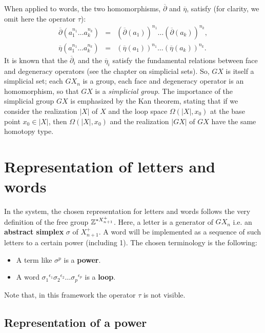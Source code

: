 When applied to words, the two homomorphisms, $\overline{\partial}$ and $\overline{\eta}$,  satisfy
(for cla\-ri\-ty, we omit here the operator $\tau$):
\begin{eqnarray*}
\overline{\partial}(a_1^{n_1}\ldots a_k^{n_k}) &=& (\overline{\partial}(a_1))^{n_1}\ldots
                                                   (\overline{\partial}(a_k))^{n_k}, \\
\overline{\eta}(a_1^{n_1}\ldots a_k^{n_k}) &=& (\overline{\eta}(a_1))^{n_1}\ldots (\overline{\eta}(a_k))^{n_k}.
\end{eqnarray*}
It is known  that the $\overline{\partial}_i$ and the $\overline{\eta}_i$ satisfy the
fundamental relations between face and degeneracy operators (see the chapter on simplicial sets). So,
$GX$ is itself a simplicial set; each $GX_n$ is a group, each face and degeneracy operator
is an homomorphism, so that $GX$ is a {\em simplicial group}.
The importance of the simplicial group $GX$ is emphasized by the Kan theorem, stating
that if we consider the realization $|X|$ of $X$ and the loop space  $\Omega(|X|, x_0)$ at
the base point $x_0 \in |X|$,  then $\Omega(|X|, x_0)$ and
the realization $|GX|$ of $GX$ have the same  homotopy type.

\section {Representation of letters and words}

In the system, the chosen representation for letters and words follows the very definition
of the free group ${\mathbb{Z}}^{*X_{n+1}^+}$. Here, a letter is a generator of $GX_n$ i.e. an {\bf abstract simplex}
$\sigma$ of $X^+_{n+1}$.
A word will be implemented  as a sequence of such letters to a certain power (including 1).
The chosen terminology is the following:
\begin{itemize}
\item A term like $\sigma^p$ is a {\bf power}.
\item A word ${\sigma_1}^{\epsilon_1} {\sigma_2}^{\epsilon_2} \ldots {\sigma_p}^{\epsilon_p}$
is a {\bf loop}.
\end{itemize}
Note that, in this framework the operator $\tau$ is not visible.

\subsection{Representation of a power}

